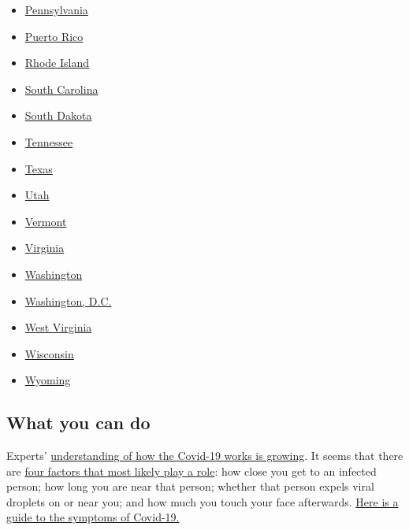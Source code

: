 \begin{itemize}
\item
  \href{https://www.nytimes.com/interactive/2020/us/pennsylvania-coronavirus-cases.html}{Pennsylvania}
\item
  \href{https://www.nytimes.com/interactive/2020/us/puerto-rico-coronavirus-cases.html}{Puerto
  Rico}
\item
  \href{https://www.nytimes.com/interactive/2020/us/rhode-island-coronavirus-cases.html}{Rhode
  Island}
\item
  \href{https://www.nytimes.com/interactive/2020/us/south-carolina-coronavirus-cases.html}{South
  Carolina}
\item
  \href{https://www.nytimes.com/interactive/2020/us/south-dakota-coronavirus-cases.html}{South
  Dakota}
\item
  \href{https://www.nytimes.com/interactive/2020/us/tennessee-coronavirus-cases.html}{Tennessee}
\item
  \href{https://www.nytimes.com/interactive/2020/us/texas-coronavirus-cases.html}{Texas}
\item
  \href{https://www.nytimes.com/interactive/2020/us/utah-coronavirus-cases.html}{Utah}
\item
  \href{https://www.nytimes.com/interactive/2020/us/vermont-coronavirus-cases.html}{Vermont}
\item
  \href{https://www.nytimes.com/interactive/2020/us/virginia-coronavirus-cases.html}{Virginia}
\item
  \href{https://www.nytimes.com/interactive/2020/us/washington-coronavirus-cases.html}{Washington}
\item
  \href{https://www.nytimes.com/interactive/2020/us/washington-dc-coronavirus-cases.html}{Washington,
  D.C.}
\item
  \href{https://www.nytimes.com/interactive/2020/us/west-virginia-coronavirus-cases.html}{West
  Virginia}
\item
  \href{https://www.nytimes.com/interactive/2020/us/wisconsin-coronavirus-cases.html}{Wisconsin}
\item
  \href{https://www.nytimes.com/interactive/2020/us/wyoming-coronavirus-cases.html}{Wyoming}
\end{itemize}

\hypertarget{what-you-can-do}{%
\subsection{What you can do}\label{what-you-can-do}}

Experts'
\href{https://www.nytimes.com/2020/06/02/health/coronavirus-profile-covid.html}{understanding
of how the Covid-19 works is growing}. It seems that there are
\href{https://www.nytimes.com/article/coronavirus-how-it-spreads.html}{four
factors that most likely play a role}: how close you get to an infected
person; how long you are near that person; whether that person expels
viral droplets on or near you; and how much you touch your face
afterwards.
\href{https://www.nytimes.com/interactive/2020/08/05/well/covid-19-symptoms.html}{Here
is a guide to the symptoms of Covid-19.}

